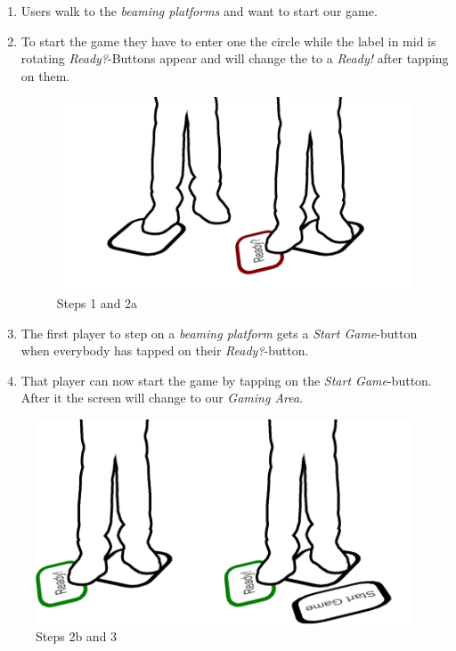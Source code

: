 \documentclass{sigchi}
\begin{document}
\begin{enumerate}
\item Users walk to the \textit{beaming platforms} and want to start our game.
\item To start the game they have to enter one the circle while the label in mid is rotating \textit{Ready?}-Buttons appear and will change the to a \textit{Ready!} after tapping on them.
\begin{figure}[H]
\centering
\includegraphics[width=0.9\columnwidth]{walkthrough/klein/beamingarea1+2a}
\caption{Steps 1 and 2a}
\label{fig:gamingArea}
\end{figure}

\item The first player to step on a \textit{beaming platform} gets a \textit{Start Game}-button when everybody has tapped on their \textit{Ready?}-button.
\item That player can now start the game by tapping on the \textit{Start Game}-button. After it the screen will change to our \textit{Gaming Area}.
\end{enumerate}

\begin{figure}[H]
\centering
\includegraphics[width=0.9\columnwidth]{walkthrough/klein/beamingarea2b+3}
\caption{Steps 2b and 3}
\label{fig:gamingArea}
\end{figure}
\end{document}
